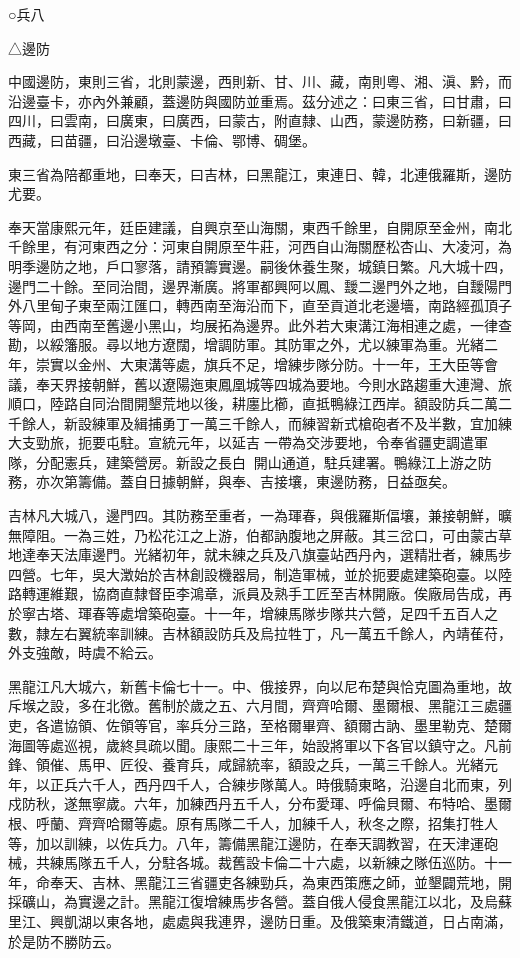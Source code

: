 
\begin{pinyinscope}
○兵八

△邊防

中國邊防，東則三省，北則蒙邊，西則新、甘、川、藏，南則粵、湘、滇、黔，而沿邊臺卡，亦內外兼顧，蓋邊防與國防並重焉。茲分述之：曰東三省，曰甘肅，曰四川，曰雲南，曰廣東，曰廣西，曰蒙古，附直隸、山西，蒙邊防務，曰新疆，曰西藏，曰苗疆，曰沿邊墩臺、卡倫、鄂博、碉堡。

東三省為陪都重地，曰奉天，曰吉林，曰黑龍江，東連日、韓，北連俄羅斯，邊防尤要。

奉天當康熙元年，廷臣建議，自興京至山海關，東西千餘里，自開原至金州，南北千餘里，有河東西之分：河東自開原至牛莊，河西自山海關歷松杏山、大凌河，為明季邊防之地，戶口寥落，請預籌實邊。嗣後休養生聚，城鎮日繁。凡大城十四，邊門二十餘。至同治間，邊界漸廣。將軍都興阿以鳳、靉二邊門外之地，自靉陽門外八里甸子東至兩江匯口，轉西南至海沿而下，直至貢道北老邊墻，南路經孤頂子等岡，由西南至舊邊小黑山，均展拓為邊界。此外若大東溝江海相連之處，一律查勘，以綏籓服。尋以地方遼闊，增調防軍。其防軍之外，尤以練軍為重。光緒二年，崇實以金州、大東溝等處，旗兵不足，增練步隊分防。十一年，王大臣等會議，奉天界接朝鮮，舊以遼陽迤東鳳凰城等四城為要地。今則水路趨重大連灣、旅順口，陸路自同治間開墾荒地以後，耕廛比櫛，直抵鴨綠江西岸。額設防兵二萬二千餘人，新設練軍及緝捕勇丁一萬三千餘人，而練習新式槍砲者不及半數，宜加練大支勁旅，扼要屯駐。宣統元年，以延吉一帶為交涉要地，令奉省疆吏調遣軍隊，分配憲兵，建築營房。新設之長白，開山通道，駐兵建署。鴨綠江上游之防務，亦次第籌備。蓋自日據朝鮮，與奉、吉接壤，東邊防務，日益亟矣。

吉林凡大城八，邊門四。其防務至重者，一為琿春，與俄羅斯偪壤，兼接朝鮮，曠無障阻。一為三姓，乃松花江之上游，伯都訥腹地之屏蔽。其三岔口，可由蒙古草地達奉天法庫邊門。光緒初年，就未練之兵及八旗臺站西丹內，選精壯者，練馬步四營。七年，吳大澂始於吉林創設機器局，制造軍械，並於扼要處建築砲臺。以陸路轉運維艱，協商直隸督臣李鴻章，派員及熟手工匠至吉林開廠。俟廠局告成，再於寧古塔、琿春等處增築砲臺。十一年，增練馬隊步隊共六營，足四千五百人之數，隸左右翼統率訓練。吉林額設防兵及烏拉牲丁，凡一萬五千餘人，內靖萑苻，外支強敵，時虞不給云。

黑龍江凡大城六，新舊卡倫七十一。中、俄接界，向以尼布楚與恰克圖為重地，故斥堠之設，多在北徼。舊制於歲之五、六月間，齊齊哈爾、墨爾根、黑龍江三處疆吏，各遣協領、佐領等官，率兵分三路，至格爾畢齊、額爾古訥、墨里勒克、楚爾海圖等處巡視，歲終具疏以聞。康熙二十三年，始設將軍以下各官以鎮守之。凡前鋒、領催、馬甲、匠役、養育兵，咸歸統率，額設之兵，一萬三千餘人。光緒元年，以正兵六千人，西丹四千人，合練步隊萬人。時俄騎東略，沿邊自北而東，列戍防秋，遂無寧歲。六年，加練西丹五千人，分布愛琿、呼倫貝爾、布特哈、墨爾根、呼蘭、齊齊哈爾等處。原有馬隊二千人，加練千人，秋冬之際，招集打牲人等，加以訓練，以佐兵力。八年，籌備黑龍江邊防，在奉天調教習，在天津運砲械，共練馬隊五千人，分駐各城。裁舊設卡倫二十六處，以新練之隊伍巡防。十一年，命奉天、吉林、黑龍江三省疆吏各練勁兵，為東西策應之師，並墾闢荒地，開採礦山，為實邊之計。黑龍江復增練馬步各營。蓋自俄人侵食黑龍江以北，及烏蘇里江、興凱湖以東各地，處處與我連界，邊防日重。及俄築東清鐵道，日占南滿，於是防不勝防云。


\end{pinyinscope}

